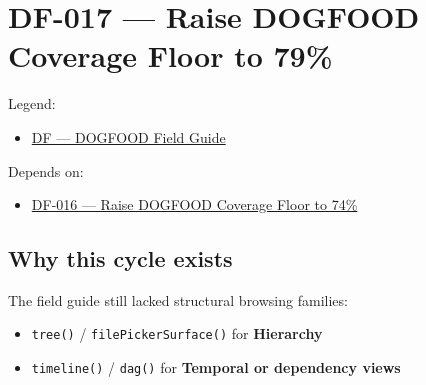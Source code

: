 \chapter{DF-017 --- Raise DOGFOOD Coverage Floor to 79\%}\label{record-079}

\smallskip

Legend:

\begin{itemize}
\tightlist
\item
  \href{https://github.com/flyingrobots/bijou/blob/1853ad902f6bf219326409e7f743a5a1d6517dbc/docs/legends/DF-dogfood-field-guide.md}{DF --- DOGFOOD Field Guide}
\end{itemize}

Depends on:

\begin{itemize}
\tightlist
\item
  \href{https://github.com/flyingrobots/bijou/blob/cbd70612140e7a450d764b3c7be1c6af878b99bc/docs/design/DF-016-raise-dogfood-coverage-floor-to-74-percent.md}{DF-016 --- Raise DOGFOOD Coverage Floor to 74\%}
\end{itemize}

\section{Why this cycle exists}\label{record-079-why-this-cycle-exists}

The field guide still lacked structural browsing families:

\begin{itemize}
\tightlist
\item
  \texttt{t\allowbreak{}r\allowbreak{}e\allowbreak{}e\allowbreak{}(\allowbreak{})} / \texttt{f\allowbreak{}i\allowbreak{}l\allowbreak{}e\allowbreak{}P\allowbreak{}i\allowbreak{}c\allowbreak{}k\allowbreak{}e\allowbreak{}r\allowbreak{}S\allowbreak{}u\allowbreak{}r\allowbreak{}f\allowbreak{}a\allowbreak{}c\allowbreak{}e\allowbreak{}(\allowbreak{})} for \textbf{Hierarchy}
\item
  \texttt{t\allowbreak{}i\allowbreak{}m\allowbreak{}e\allowbreak{}l\allowbreak{}i\allowbreak{}n\allowbreak{}e\allowbreak{}(\allowbreak{})} / \texttt{d\allowbreak{}a\allowbreak{}g\allowbreak{}(\allowbreak{})} for \textbf{Temporal or dependency views}
\end{itemize}

